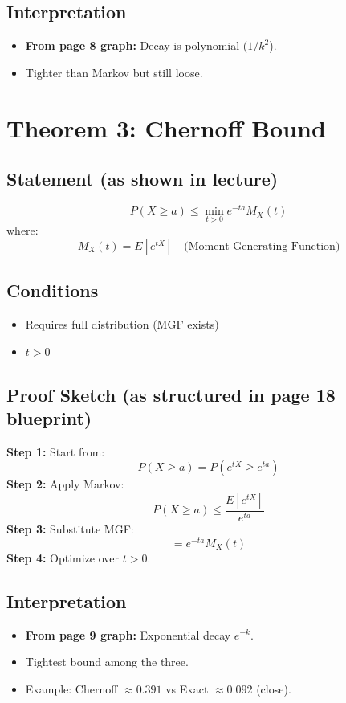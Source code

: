\documentclass[11pt]{article}
\begin{document}
\subsection{Interpretation}
\begin{itemize}
    \item \textbf{From page 8 graph:} Decay is polynomial ($1/k^2$).
    \item Tighter than Markov but still loose.
\end{itemize}

\section{Theorem 3: Chernoff Bound}
\subsection{Statement (as shown in lecture)}
\[ P(X \ge a) \le \min_{t > 0} e^{-ta} M_X(t) \]
where:
\[ M_X(t) = E[e^{tX}] \quad \text{(Moment Generating Function)} \]

\subsection{Conditions}
\begin{itemize}
    \item Requires full distribution (MGF exists)
    \item $t > 0$
\end{itemize}

\subsection{Proof Sketch (as structured in page 18 blueprint)}
\textbf{Step 1:} Start from:
\[ P(X \ge a) = P(e^{tX} \ge e^{ta}) \]
\textbf{Step 2:} Apply Markov:
\[ P(X \ge a) \le \frac{E[e^{tX}]}{e^{ta}} \]
\textbf{Step 3:} Substitute MGF:
\[ = e^{-ta} M_X(t) \]
\textbf{Step 4:} Optimize over $t > 0$.

\subsection{Interpretation}
\begin{itemize}
    \item \textbf{From page 9 graph:} Exponential decay $e^{-k}$.
    \item Tightest bound among the three.
    \item Example: Chernoff $\approx 0.391$ vs Exact $\approx 0.092$ (close).
\end{itemize}
\end{document}
